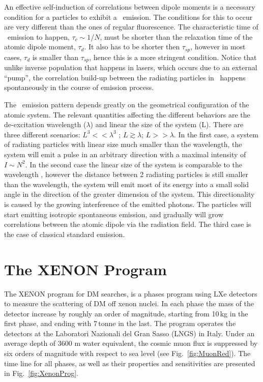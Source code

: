 An effective self-induction of correlations between dipole moments is a necessary condition for a particles to exhibit a \superradiance\ emission. The conditions for this to occur are very different than the ones of regular fluorescence. The characteristic time of \superradiance\ emission to happen, $\tau_c \sim 1/N $, must be shorter than the relaxation time of the atomic dipole moment, $\tau_d$. It also has to be shorter then $\tau_{sp}$, however in most cases, $\tau_{d}$ is smaller than $\tau_{sp}$, hence this is a more stringent condition. Notice that unlike inverse population that happens in lasers, which occurs due to an external ``pump'', the correlation build-up between the radiating particles in \superradiance\ happens spontaneously in the course of emission process.

The \superradiance\ emission pattern depends greatly on the geometrical configuration of the atomic system. The relevant quantities affecting the  different behaviors are the de-excitation wavelength ($\lambda$) and linear the size of the system (L). There are three different scenarios: $L^3<<\lambda^3$ ; $L \gtrsim \lambda$; $L>>\lambda$. In the first case, a system of radiating particles with linear size much smaller than the wavelength, the system will emit a pulse in an arbitrary direction with a maximal intensity of $I \sim N^2$. In the second case the linear size of the system is comparable to the wavelength , however the distance between 2 radiating particles is still smaller than the wavelength, the system will emit most of its energy into a small solid angle in the direction of the greater dimension of the system. This directionality is caused by the growing interference of the emitted photons. The particles will start emitting isotropic spontaneous emission, and gradually will grow correlations between the atomic dipole via the radiation field. The third case is the case of classical standard emission.

 
        








\section{The XENON Program}
\label{sec:xenonProg}

The XENON program for DM searches, is a phases program using LXe detectors to measure the scattering of DM off xenon nuclei. In each phase the mass of the detector increase by roughly an order of magnitude, starting from 10\,kg in the first phase, and ending with 7\,tonne in the last. The program operates the detectors at the Laboratori Nazionali del Gran Sasso (LNGS) in Italy. Under an average depth of 3600 m water equivalent, the cosmic muon
flux is suppressed by six orders of magnitude with respect to sea level (see Fig.~\ref{fig:MuonRed}). The time line for all phases, as well as their properties and sensitivities are presented in Fig.~\ref{fig:XenonProg}.

